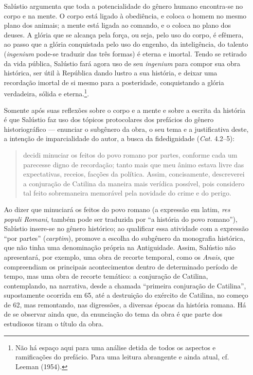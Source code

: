 Salústio argumenta que toda a potencialidade do gênero humano encontra-se no corpo e na mente. O corpo está ligado à obediência, e coloca o homem no mesmo plano dos animais; a mente está ligada ao comando, e o coloca no plano dos deuses. A glória que se alcança pela força, ou seja, pelo uso do corpo, é efêmera, ao passo que a glória conquistada pelo uso do engenho, da inteligência, do talento (\emph{ingenium} pode-se traduzir das três formas) é eterna e imortal. Tendo se retirado da vida pública, Salústio fará agora uso de seu \emph{ingenium} para compor sua obra histórica, ser útil à República dando lustro a sua história, e deixar uma recordação imortal de si mesmo para a posteridade, conquistando a glória verdadeira, sólida e eterna.\footnote{Não há espaço aqui para uma análise detida de todos os aspectos e ramificações do prefácio. Para uma leitura abrangente e ainda atual, cf. Leeman (1954).}. 
 

Somente após suas reflexões sobre o corpo  e a mente e sobre a escrita da
história é que Salústio faz uso dos tópicos protocolares dos prefácios do
gênero historiográfico --- enunciar o subgênero da obra, o seu tema e a
justificativa deste, a intenção de imparcialidade do autor, a busca da
fidedignidade (\emph{Cat.} 4.2--5):

\begin{quote}

decidi minuciar
os feitos do povo romano por partes, conforme cada um parecesse digno de
recordação; tanto mais que meu ânimo estava livre das expectativas, receios,
facções da política. Assim, concisamente, descreverei a conjuração de Catilina da maneira mais verídica possível, pois considero tal feito sobremaneira memorável
pela novidade do crime e do perigo.

\end{quote}


Ao dizer que minuciará os feitos do povo romano (a expressão em latim,
\emph{res populi Romani}, também pode ser traduzida por “a história do povo
romano”), Salústio insere-se no gênero histórico; ao qualificar essa atividade
com a expressão “por partes” (\emph{carptim}), promove a escolha do subgênero
da monografia histórica, que não tinha uma denominação própria na Antiguidade. Assim, Salústio não apresentará, por exemplo, uma obra de recorte temporal, como os \emph{Anais}, que compreendiam os principais acontecimentos dentro de determinado período de tempo, mas uma obra de recorte temático: a conjuração de Catilina, contemplando, na narrativa, desde a chamada ``primeira conjuração de Catilina'', supostamente ocorrida em 65, até a destruição do exército de Catilina, no começo de 62, mas remontando, nas digressões, a diversas épocas da história romana. Há de se observar ainda que, da enunciação do tema da obra é que parte dos estudiosos tiram o título da obra.

